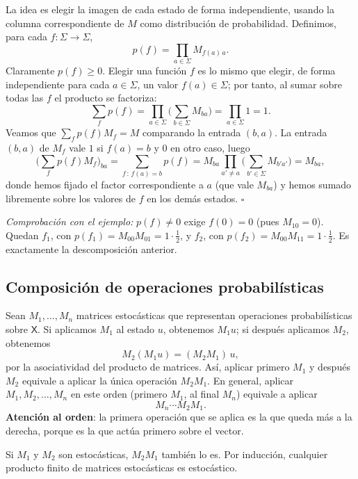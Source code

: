 \documentclass[11pt, a4paper, twoside, openright]{report}
\begin{document}
\begin{tcolorbox}[colback=gray!5!white,colframe=gray!75!black,title=\textbf{Demostración}]
La idea es elegir la imagen de cada estado de forma independiente, usando la columna correspondiente de $M$ como distribución de probabilidad. Definimos, para cada $f : \Sigma \to \Sigma$,
\[ p(f) = \prod_{a \in \Sigma} M_{f(a)\,a}. \]
Claramente $p(f) \geq 0$. Elegir una función $f$ es lo mismo que elegir, de forma independiente para cada $a \in \Sigma$, un valor $f(a) \in \Sigma$; por tanto, al sumar sobre todas las $f$ el producto se factoriza:
\[ \sum_{f} p(f) = \prod_{a \in \Sigma} \Big( \sum_{b \in \Sigma} M_{ba} \Big) = \prod_{a \in \Sigma} 1 = 1. \]
Veamos que $\sum_f p(f) M_f = M$ comparando la entrada $(b, a)$. La entrada $(b,a)$ de $M_f$ vale $1$ si $f(a) = b$ y $0$ en otro caso, luego
\[ \Big( \sum_f p(f) M_f \Big)_{ba} = \sum_{f \,:\, f(a) = b} p(f) = M_{ba} \prod_{a' \neq a} \Big( \sum_{b' \in \Sigma} M_{b'a'} \Big) = M_{ba}, \]
donde hemos fijado el factor correspondiente a $a$ (que vale $M_{ba}$) y hemos sumado libremente sobre los valores de $f$ en los demás estados. \hfill $\square$

\textit{Comprobación con el ejemplo:} $p(f) \neq 0$ exige $f(0) = 0$ (pues $M_{10} = 0$). Quedan $f_1$, con $p(f_1) = M_{00} M_{01} = 1 \cdot \frac12$, y $f_2$, con $p(f_2) = M_{00} M_{11} = 1 \cdot \frac12$. Es exactamente la descomposición anterior.
\end{tcolorbox}

\subsection{Composición de operaciones probabilísticas}

\noindent Sean $M_1, \dots, M_n$ matrices estocásticas que representan operaciones probabilísticas sobre $\mathsf{X}$. Si aplicamos $M_1$ al estado $u$, obtenemos $M_1 u$; si después aplicamos $M_2$, obtenemos
\[ M_2(M_1 u) = (M_2 M_1)\, u, \]
por la asociatividad del producto de matrices. Así, aplicar primero $M_1$ y después $M_2$ equivale a aplicar la única operación $M_2 M_1$. En general, aplicar $M_1, M_2, \dots, M_n$ en este orden (primero $M_1$, al final $M_n$) equivale a aplicar
\[ M_n \cdots M_2 M_1. \]
\textbf{Atención al orden}: la primera operación que se aplica es la que queda más a la derecha, porque es la que actúa primero sobre el vector.

\begin{tcolorbox}[colback=teal!5!white,colframe=teal!75!black,title=\textbf{Proposición: El producto de matrices estocásticas es estocástico}]
Si $M_1$ y $M_2$ son estocásticas, $M_2 M_1$ también lo es. Por inducción, cualquier producto finito de matrices estocásticas es estocástico.
\end{tcolorbox}
\end{document}
